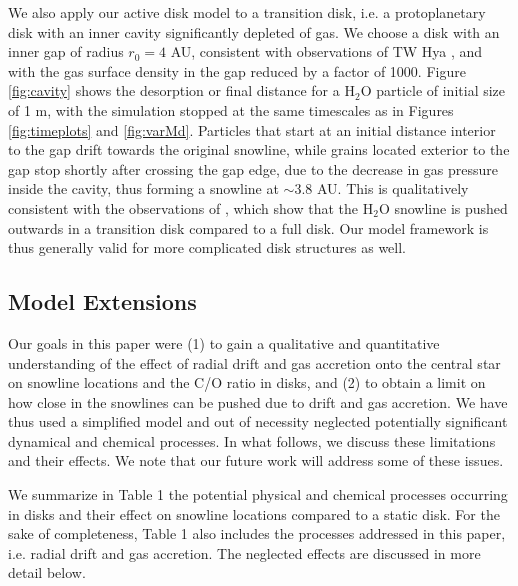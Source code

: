 \documentclass[apj]{emulateapj}
\begin{document}
We also apply our active disk model to a transition disk, i.e. a protoplanetary disk with an inner cavity significantly depleted of gas. We choose a disk with an inner gap of radius $r_0=4$ AU, consistent with observations of TW Hya \citep{zhang13}, and with the gas surface density in the gap reduced by a factor of 1000. Figure \ref{fig:cavity} shows the desorption or final distance for a H$_2$O particle of initial size of 1 m, with the simulation stopped at the same timescales as in Figures \ref{fig:timeplots} and \ref{fig:varMd}. Particles that start at an initial distance interior to the gap drift towards the original snowline, while grains located exterior to the gap stop shortly after crossing the gap edge, due to the decrease in gas pressure inside the cavity, thus forming a snowline at $\sim$$3.8$ AU. This is qualitatively consistent with the observations of \citet{zhang13}, which show that the H$_2$O snowline is pushed outwards in a transition disk compared to a full disk. Our model framework is thus generally valid for more complicated disk structures as well.  




\subsection{Model Extensions}
\label{sec:neglected}

Our goals in this paper were (1) to gain a qualitative and quantitative understanding of the effect of radial drift and gas accretion onto the central star on snowline locations and the C/O ratio in disks, and (2) to obtain a limit on how close in the snowlines can be pushed due to drift and gas accretion. We have thus used a simplified model and out of necessity neglected potentially significant dynamical and chemical processes. In what follows, we discuss these limitations and their effects. We note that our future work will address some of these issues. 




We summarize in Table 1 the potential physical and chemical processes occurring in disks and their effect on snowline locations compared to a static disk. For the sake of completeness, Table 1 also includes the processes addressed in this paper, i.e. radial drift and gas accretion. The neglected effects are discussed in more detail below. 
\end{document}
